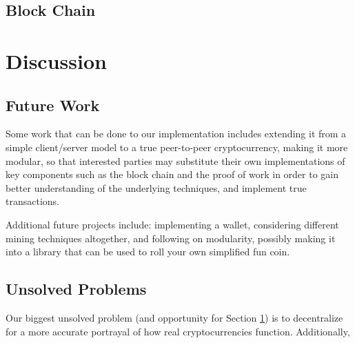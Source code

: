 \documentclass[12pt]{article}
\begin{document}
\subsection{Block Chain}

\section{Discussion}\label{future}
\subsection{Future Work}\label{work}
Some work that can be done to our implementation includes extending it from a simple client/server model to a true peer-to-peer cryptocurrency, making it more modular, so that interested parties may substitute their own implementations of key components such as the block chain and the proof of work in order to gain better understanding of the underlying techniques, and implement true transactions. 

Additional future projects include: implementing a wallet, considering different mining techniques altogether, and following on modularity, possibly making it into a library that can be used to roll your own simplified fun coin.

\subsection{Unsolved Problems}\label{unsolved}
Our biggest unsolved problem (and opportunity for Section \ref{future}) is to decentralize for a more accurate portrayal of how real cryptocurrencies function. Additionally, 



\end{document}
